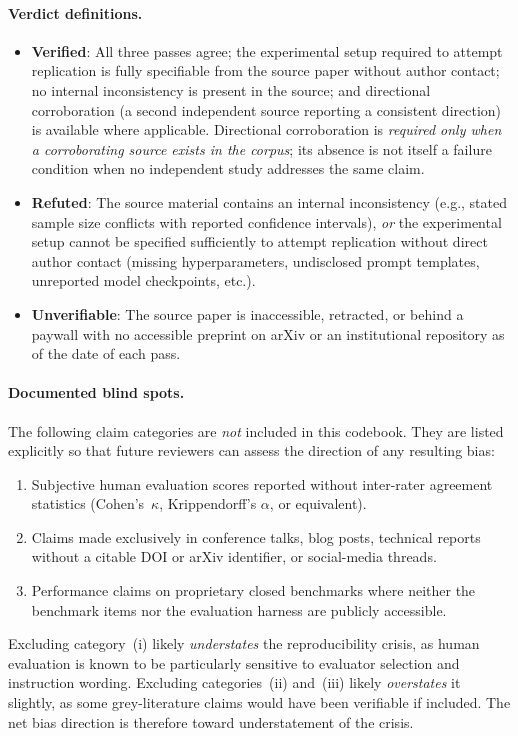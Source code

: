 \paragraph{Verdict definitions.}
\begin{itemize}
  \item \textbf{Verified}: All three passes agree; the experimental setup
        required to attempt replication is fully specifiable from the source
        paper without author contact; no internal inconsistency is present
        in the source; and directional corroboration (a second independent
        source reporting a consistent direction) is available where
        applicable.
        Directional corroboration is \emph{required only when a corroborating
        source exists in the corpus}; its absence is not itself a failure
        condition when no independent study addresses the same claim.

  \item \textbf{Refuted}: The source material contains an internal
        inconsistency (e.g., stated sample size conflicts with reported
        confidence intervals), \emph{or} the experimental setup cannot be
        specified sufficiently to attempt replication without direct author
        contact (missing hyperparameters, undisclosed prompt templates,
        unreported model checkpoints, etc.).

  \item \textbf{Unverifiable}: The source paper is inaccessible,
        retracted, or behind a paywall with no accessible preprint on
        arXiv or an institutional repository as of the date of each pass.
\end{itemize}

\paragraph{Documented blind spots.}
The following claim categories are \emph{not} included in this codebook.
They are listed explicitly so that future reviewers can assess the direction
of any resulting bias:
\begin{enumerate}
  \item[(i)] Subjective human evaluation scores reported without
        inter-rater agreement statistics (Cohen's~$\kappa$, Krippendorff's
        $\alpha$, or equivalent).
  \item[(ii)] Claims made exclusively in conference talks, blog posts,
        technical reports without a citable DOI or arXiv identifier, or
        social-media threads.
  \item[(iii)] Performance claims on proprietary closed benchmarks where
        neither the benchmark items nor the evaluation harness are
        publicly accessible.
\end{enumerate}
Excluding category~(i) likely \emph{understates} the reproducibility
crisis, as human evaluation is known to be particularly sensitive to
evaluator selection and instruction wording.
Excluding categories~(ii) and~(iii) likely \emph{overstates} it slightly,
as some grey-literature claims would have been verifiable if included.
The net bias direction is therefore toward understatement of the crisis.

